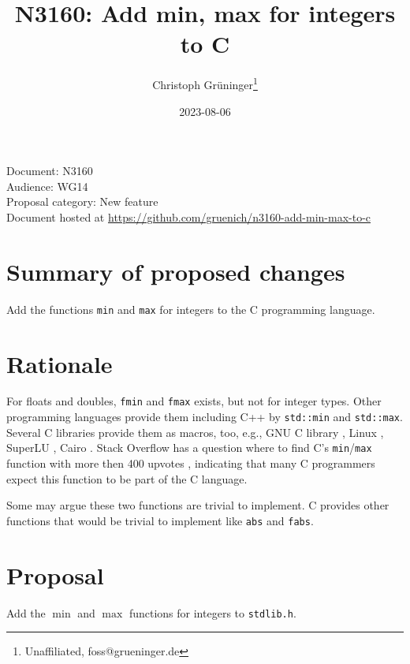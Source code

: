 \documentclass[a4paper,10pt]{scrartcl}
\title{N3160: Add min, max for integers to C}
\author{Christoph Grüninger\footnote{Unaffiliated, foss@grueninger.de}}
\date{2023-08-06}
\begin{document}
\lstset{language=C,basicstyle=\ttfamily}

\maketitle

\noindent
Document: N3160\\
Audience: WG14\\
Proposal category: New feature\\
Document hosted at \url{https://github.com/gruenich/n3160-add-min-max-to-c}

\section{Summary of proposed changes}

Add the functions \lstinline{min} and \lstinline{max} for integers to the C programming language.

\section{Rationale}

For floats and doubles, \lstinline{fmin} and \lstinline{fmax} exists, but not for integer types. Other
programming languages provide them including C++ by \lstinline{std::min} and \lstinline{std::max}. Several
C libraries provide them as macros, too, e.g., GNU C library \cite{GLibc}, Linux \cite{Linux},
SuperLU \cite{SuperLU}, Cairo \cite{Cairo}.
Stack Overflow has a question where to find C's \lstinline{min}/\lstinline{max} function with more
then 400 upvotes \cite{Stackoverflow}, indicating that many C programmers expect this function to be
part of the C language.

Some may argue these two functions are trivial to implement. C provides other functions that would be
trivial to implement like \lstinline{abs} and \lstinline{fabs}.

\section{Proposal}
Add the $\operatorname{min}$ and $\operatorname{max}$ functions for integers to \lstinline{stdlib.h}.
\end{document}
